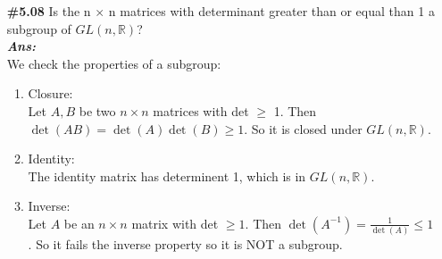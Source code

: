 \documentclass[12pt]{article}
\newcommand{\sol}{\setlength{\parindent}{0cm}\textbf{\textit{Ans:}}\setlength{\parindent}{1cm} }
\begin{document}
\begin{enumerate}[start=1,label={\bfseries Question \arabic*:},leftmargin=1in]
  \item[\textbf{\#5.08}] Is the n $\times$ n matrices with determinant greater than or equal than 1 a subgroup of 
  $GL(n, \mathbb{R})$?\\
  \sol{}\\
  We check the properties of a subgroup:
  \begin{enumerate}
    \item Closure: \\
    Let \( A, B \) be two \( n \times n \) matrices with det $\geq$ 1. 
    Then \( \det(AB) = \det(A)\det(B) \geq 1 \).
    So it is closed under $GL(n, \mathbb{R})$.
    \item Identity: \\
    The identity matrix has determinent 1, which is in $GL(n, \mathbb{R})$.
    \item Inverse: \\
    Let \( A \) be an \( n \times n \) matrix with det $\geq 1$.
    Then \( \det(A^{-1}) = \frac{1}{\det(A)} \leq 1 \).
    So it fails the inverse property so it is NOT a subgroup.
  \end{enumerate}
  

\end{enumerate}
\end{document}
